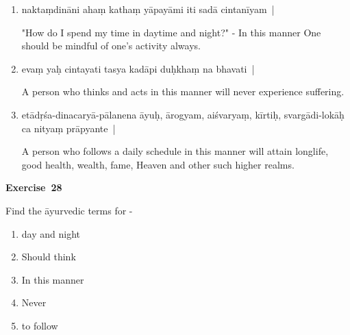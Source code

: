 \begin{enumerate}
\itemsep=0pt
\item {}

naktaṃdināni ahaṃ kathaṃ yāpayāmi iti sadā cintanīyam~|

"How do I spend my time in daytime and night?" - In this manner One should be mindful of one's activity always. 

\item {}

evaṃ yaḥ cintayati tasya kadāpi duḥkhaṃ na bhavati~| 

A person who thinks and acts in this manner will never experience suffering. 

\item {}

etādṛśa-dinacaryā-pālanena āyuḥ, ārogyam, aiśvaryaṃ, kīrtiḥ, svargādi-lokāḥ ca nityaṃ prāpyante~|

A person who follows a daily schedule in this manner will attain longlife, good health, wealth, fame, Heaven and other such higher realms.
\end{enumerate}

\centerline{\textbf{Exercise~28}}

Find the āyurvedic terms for -
\begin{enumerate}
\itemsep=0pt
\renewcommand{\theenumi}{\alph{enumi}}
\renewcommand{\labelenumi}{\theenumi.}
\item day and night 
\item Should think
\item In this manner 
\item Never
\item to follow
\end{enumerate}
